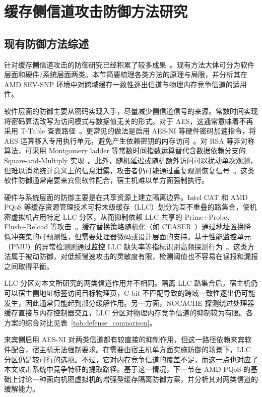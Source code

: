 \chapter{缓存侧信道攻击防御方法研究}

\section{现有防御方法综述}\label{sec:defense_survey}

针对缓存侧信道攻击的防御研究已经积累了较多成果~\cite{ge2018survey,lou2022survey}。现有方法大体可分为软件层面和硬件/系统层面两类。本节简要梳理各类方法的原理与局限，并分析其在 AMD SEV-SNP 环境中对跨域缓存一致性逐出信道与物理内存竞争信道的适用性。

软件层面的防御主要从密码实现入手，尽量减少侧信道信号的来源。常数时间实现将密码算法改写为访问模式与数据值无关的形式。对于 AES，这通常意味着不再采用 T-Table 查表路径~\cite{Bernstein2005CachetimingAO,osvik2006cache}。更常见的做法是启用 AES-NI 等硬件密码加速指令，将 AES 运算移入专用执行单元，避免产生依赖密钥的内存访问~\cite{tromer2010efficient}。对 RSA 等非对称算法，可采用 Montgomery ladder 等常数时间指数运算替代含数据依赖分支的 Square-and-Multiply 实现~\cite{kocher1996timing}。此外，随机延迟或随机额外访问可以扰动单次观测，但难以消除统计意义上的信息泄露，攻击者仍可能通过重复观测恢复信号~\cite{lou2022survey}。这类软件防御通常需要来宾侧软件配合，宿主机难以单方面强制执行。

硬件与系统层面的防御主要是在共享资源上建立隔离边界。Intel CAT 和 AMD PQoS 等缓存资源管理技术可将末级缓存（LLC）划分为互不重叠的路集合，使机密虚拟机占用特定 LLC 分区，从而抑制依赖 LLC 共享的 Prime+Probe、Flush+Reload 等攻击~\cite{intel_cat_spec,amd_pqos_ppr,liu2016catalyst}。缓存替换策略随机化（如 CEASER~\cite{qureshi2018ceaser}）通过地址置换降低冲突集的可预测性，但需要处理器微码或设计层面的支持。基于性能监控单元（PMU）的异常检测则通过监控 LLC 缺失率等指标识别高频探测行为~\cite{gast2025counterseveillance}。这类方法属于被动防御，对低频慢速攻击的灵敏度有限，检测阈值也不容易在误报和漏报之间取得平衡。

LLC 分区对本文所研究的两类信道作用并不相同。隔离 LLC 路集合后，宿主机仍可以宿主侧地址标签访问目标物理页，C-bit 不匹配导致的跨域一致性逐出仍可能发生，因此通常只能起到部分缓解作用。另一方面，NOCACHE 探测绕过处理器缓存直接与内存控制器交互，LLC 分区对物理内存竞争信道的抑制较为有限。各方案的综合对比见表~\ref{tab:defense_comparison}。

来宾侧启用 AES-NI 对两类信道都有较直接的抑制作用，但这一路径依赖来宾软件配合，宿主机无法强制要求。在需要由宿主机单方面实施防御的场景下，LLC 分区仍是较可行的选项。不过，它对内存竞争信道的覆盖不足，而这一点也对应了本文攻击系统中竞争特征的提取路径。基于这一情况，下一节在 AMD PQoS 的基础上讨论一种面向机密虚拟机的增强型缓存隔离防御方案，并分析其对两类信道的缓解能力。

